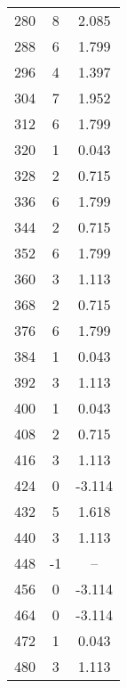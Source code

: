 \begin{longtable}{ccc}
280 & 8 & 2.085 \\
288 & 6 & 1.799 \\
296 & 4 & 1.397 \\
304 & 7 & 1.952 \\
312 & 6 & 1.799 \\
320 & 1 & 0.043 \\
328 & 2 & 0.715 \\
336 & 6 & 1.799 \\
344 & 2 & 0.715 \\
352 & 6 & 1.799 \\
360 & 3 & 1.113 \\
368 & 2 & 0.715 \\
376 & 6 & 1.799 \\
384 & 1 & 0.043 \\
392 & 3 & 1.113 \\
400 & 1 & 0.043 \\
408 & 2 & 0.715 \\
416 & 3 & 1.113 \\
424 & 0 & -3.114 \\
432 & 5 & 1.618 \\
440 & 3 & 1.113 \\
448 & -1 & -- \\
456 & 0 & -3.114 \\
464 & 0 & -3.114 \\
472 & 1 & 0.043 \\
480 & 3 & 1.113 \\
\hline
\end{longtable}
